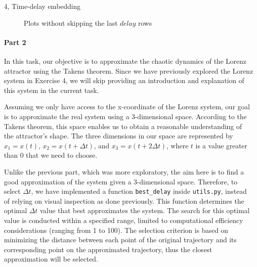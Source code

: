 \begin{task}{4, Time-delay embedding}
\begin{figure}[H]
\caption{Plots without skipping the last \(delay\) rows}
\label{noskippart}
\end{figure}



\paragraph{Part 2} In this task, our objective is to approximate the chaotic dynamics of the Lorenz attractor using the Takens theorem. Since we have previously explored the Lorenz system in Exercise 4, we will skip providing an introduction and explanation of this system in the current task.

Assuming we only have access to the x-coordinate of the Lorenz system, our goal is to approximate the real system using a 3-dimensional space. According to the Takens theorem, this space enables us to obtain a reasonable understanding of the attractor's shape. The three dimensions in our space are represented by \(x_1 = x(t)\), \(x_2 = x(t + \Delta t)\), and \(x_3 = x(t + 2\Delta t)\), where \(t\) is a value greater than 0 that we need to choose.

Unlike the previous part, which was more exploratory, the aim here is to find a good approximation of the system given a 3-dimensional space.
Therefore, to select \(\Delta t\), we have implemented a function \verb|best_delay| inside \verb|utils.py|, instead of relying on visual inspection as done previously. This function determines the optimal \(\Delta t\) value that best approximates the system. The search for this optimal value is conducted within a specified range, limited to computational efficiency considerations (ranging from 1 to 100). The selection criterion is based on minimizing the distance between each point of the original trajectory and its corresponding point on the approximated trajectory, thus the closest approximation will be selected.


\end{task}
